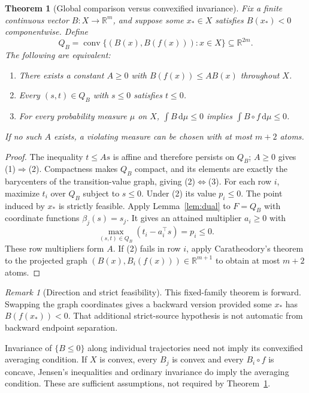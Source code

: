 \documentclass[journal,10pt]{IEEEtran}
\newtheorem{theorem}{Theorem}
\theoremstyle{definition}\newtheorem{definition}{Definition}
\theoremstyle{remark}
\newtheorem*{remark}{Remark}
\newcommand{\R}{\mathbb R}
\newcommand{\co}{\operatorname{conv}}
\newcommand{\dd}{\,\mathrm d}
\begin{document}
\begin{theorem}[Global comparison versus convexified invariance]\label{th:fixed}
Fix a finite continuous vector $B:X\to\R^m$, and suppose some $x_*\in X$ satisfies $B(x_*)<0$ componentwise. Define
\[
 Q_B=\co\{(B(x),B(f(x))):x\in X\}\subseteq\R^{2m}.
\]
The following are equivalent:
\begin{enumerate}
\item There exists a constant $A\geq0$ with $B(f(x))\leq AB(x)$ throughout $X$.
\item Every $(s,t)\in Q_B$ with $s\leq0$ satisfies $t\leq0$.
\item For every probability measure $\mu$ on $X$, $\int B\dd\mu\leq0$ implies $\int B\circ f\dd\mu\leq0$.
\end{enumerate}
If no such $A$ exists, a violating measure can be chosen with at most $m+2$ atoms.
\end{theorem}
\begin{proof}
The inequality $t\leq As$ is affine and therefore persists on $Q_B$; $A\geq0$ gives (1)$\Rightarrow$(2). Compactness makes $Q_B$ compact, and its elements are exactly the barycenters of the transition-value graph, giving (2)$\Leftrightarrow$(3). For each row $i$, maximize $t_i$ over $Q_B$ subject to $s\leq0$. Under (2) its value $p_i\leq0$. The point induced by $x_*$ is strictly feasible. Apply Lemma~\ref{lem:dual} to $F=Q_B$ with coordinate functions $\beta_j(s)=s_j$. It gives an attained multiplier $a_i\geq0$ with
\[
 \max_{(s,t)\in Q_B}(t_i-a_i^\top s)=p_i\leq0.
\]
These row multipliers form $A$. If (2) fails in row $i$, apply Caratheodory's theorem to the projected graph $(B(x),B_i(f(x)))\in\R^{m+1}$ to obtain at most $m+2$ atoms.
\end{proof}


\begin{remark}[Direction and strict feasibility]
This fixed-family theorem is forward. Swapping the graph coordinates gives a backward version provided some $x_*$ has $B(f(x_*))<0$. That additional strict-source hypothesis is not automatic from backward endpoint separation.
\end{remark}
Invariance of $\{B\leq0\}$ along individual trajectories need not imply its convexified averaging condition. If $X$ is convex, every $B_j$ is convex and every $B_i\circ f$ is concave, Jensen's inequalities and ordinary invariance do imply the averaging condition. These are sufficient assumptions, not required by Theorem~\ref{th:fixed}.
\end{document}
